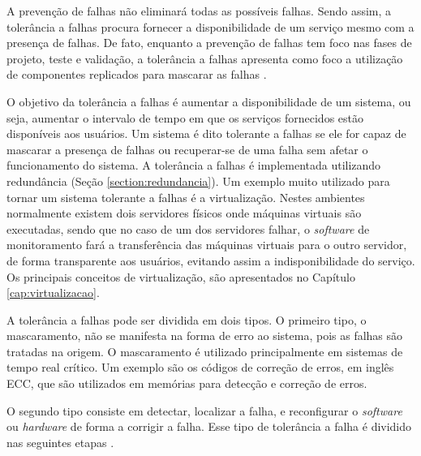 A prevenção de falhas não eliminará todas as possíveis falhas. Sendo assim, a tolerância a falhas procura fornecer a disponibilidade de 
um serviço mesmo com a presença de falhas. De fato, enquanto a prevenção de falhas tem foco nas fases de projeto, teste e validação, a 
tolerância a falhas apresenta como foco a utilização de componentes replicados para mascarar as falhas \cite{pankaj1994}.

O objetivo da tolerância a falhas é aumentar a disponibilidade de um sistema, ou seja, aumentar o intervalo de tempo em que os serviços 
fornecidos estão disponíveis aos usuários. Um sistema é dito tolerante a falhas se ele for capaz de mascarar a presença de falhas ou recuperar-se 
de uma falha sem afetar o funcionamento do sistema. A tolerância a falhas é implementada utilizando redundância (Seção \ref{section:redundancia}). 
Um exemplo muito utilizado para tornar um sistema tolerante a falhas é a virtualização. Nestes ambientes normalmente existem dois servidores 
físicos onde máquinas virtuais são executadas, sendo que no caso de um dos servidores falhar, o \textit{software} de monitoramento fará a 
transferência das máquinas virtuais para o outro servidor, de forma transparente aos usuários, evitando assim a indisponibilidade do serviço. 
Os principais conceitos de virtualização, são apresentados no Capítulo \ref{cap:virtualizacao}.

A tolerância a falhas pode ser dividida em dois tipos. O primeiro tipo, o mascaramento, não se manifesta na forma de erro ao sistema, 
pois as falhas são tratadas na origem. O mascaramento é utilizado principalmente em sistemas de tempo real crítico. Um exemplo são os 
códigos de correção de erros, em inglês \ac{ECC}, que são utilizados em memórias para detecção e correção de erros.

O segundo tipo consiste em detectar, localizar a falha, e reconfigurar o \textit{software} ou \textit{hardware} de forma a corrigir a falha. 
Esse tipo de tolerância a falha é dividido nas seguintes etapas \cite{weber2002}. 


